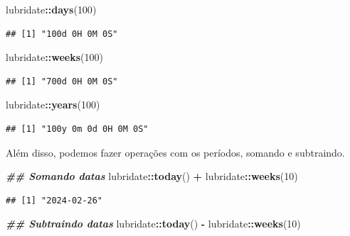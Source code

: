 \documentclass[
]{article}
\newenvironment{Shaded}{\begin{snugshade}}{\end{snugshade}}
\newcommand{\DecValTok}[1]{\textcolor[rgb]{0.00,0.00,0.81}{#1}}
\newcommand{\DocumentationTok}[1]{\textcolor[rgb]{0.56,0.35,0.01}{\textbf{\textit{#1}}}}
\newcommand{\FunctionTok}[1]{\textcolor[rgb]{0.13,0.29,0.53}{\textbf{#1}}}
\newcommand{\NormalTok}[1]{#1}
\newcommand{\SpecialCharTok}[1]{\textcolor[rgb]{0.81,0.36,0.00}{\textbf{#1}}}
\begin{document}
\begin{Shaded}
\begin{Highlighting}[]
\NormalTok{lubridate}\SpecialCharTok{::}\FunctionTok{days}\NormalTok{(}\DecValTok{100}\NormalTok{)}
\end{Highlighting}
\end{Shaded}

\begin{verbatim}
## [1] "100d 0H 0M 0S"
\end{verbatim}

\begin{Shaded}
\begin{Highlighting}[]
\NormalTok{lubridate}\SpecialCharTok{::}\FunctionTok{weeks}\NormalTok{(}\DecValTok{100}\NormalTok{)}
\end{Highlighting}
\end{Shaded}

\begin{verbatim}
## [1] "700d 0H 0M 0S"
\end{verbatim}

\begin{Shaded}
\begin{Highlighting}[]
\NormalTok{lubridate}\SpecialCharTok{::}\FunctionTok{years}\NormalTok{(}\DecValTok{100}\NormalTok{)}
\end{Highlighting}
\end{Shaded}

\begin{verbatim}
## [1] "100y 0m 0d 0H 0M 0S"
\end{verbatim}

Além disso, podemos fazer operações com os períodos, somando e subtraindo.

\begin{Shaded}
\begin{Highlighting}[]
\DocumentationTok{\#\# Somando datas}
\NormalTok{lubridate}\SpecialCharTok{::}\FunctionTok{today}\NormalTok{() }\SpecialCharTok{+}\NormalTok{ lubridate}\SpecialCharTok{::}\FunctionTok{weeks}\NormalTok{(}\DecValTok{10}\NormalTok{)}
\end{Highlighting}
\end{Shaded}

\begin{verbatim}
## [1] "2024-02-26"
\end{verbatim}

\begin{Shaded}
\begin{Highlighting}[]
\DocumentationTok{\#\# Subtraindo datas}
\NormalTok{lubridate}\SpecialCharTok{::}\FunctionTok{today}\NormalTok{() }\SpecialCharTok{{-}}\NormalTok{ lubridate}\SpecialCharTok{::}\FunctionTok{weeks}\NormalTok{(}\DecValTok{10}\NormalTok{)}
\end{Highlighting}
\end{Shaded}
\end{document}
